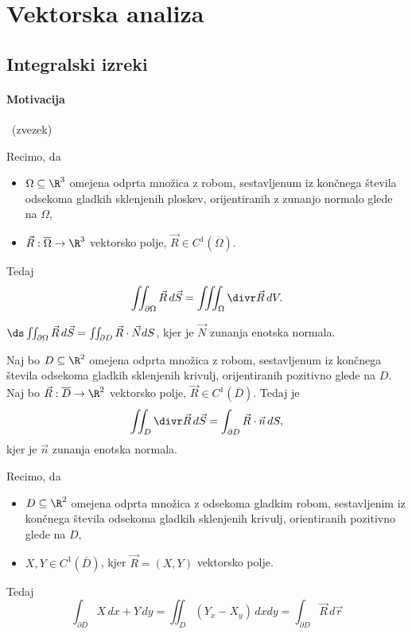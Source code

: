 \section{Vektorska analiza}

\todo

\subsection{Integralski izreki}
\paragraph{Motivacija} \todo \ (zvezek)
\begin{izrek} 
    Recimo, da     
    \begin{itemize}
        \item \(\Omega \subseteq \R^3\) omejena odprta množica z robom, sestavljenum iz končnega števila odsekoma gladkih sklenjenih ploskev, orijentiranih z zunanjo normalo glede na \(\Omega\),
        \item \(\vec{R}: \overline{\Omega} \to \R^3\) vektorsko polje, \(\vec{R} \in C^1(\overline{\Omega})\).
    \end{itemize}
    Tedaj 
    \[\iint_{\partial \Omega} \vec{R} \, d \vec{S} = \iiint_\Omega \divr \vec{R} \, d V .\]
\end{izrek}

\begin{opomba}
    \(\ds \iint_{\partial \Omega} \vec{R} \, d \vec{S} = \iint_{\partial D} \vec{R} \cdot \vec{N} dS\), kjer je \(\vec{N}\) zunanja enotska normala.
\end{opomba}

\begin{opomba}[\(n = 2\)]
    Naj bo \(D\subseteq \R^2\) omejena odprta množica z robom, sestavljenum iz končnega števila odsekoma gladkih sklenjenih krivulj, orijentiranih pozitivno glede na \(D\). Naj bo \(\vec{R}: \overline{D} \to \R^2\) vektorsko polje, \(\vec{R} \in C^1(\overline{D})\). Tedaj je 
    \[\iint_D \divr \vec{R} \, d \vec{S} = \int_{\partial D} \vec{R} \cdot \vec{n} \, dS,\]
    kjer je \(\vec{n}\) zunanja enotska normala.
\end{opomba}

\begin{izrek}
    Recimo, da
    \begin{itemize}
        \item \(D \subseteq \R^2\) omejena odprta množica z odsekoma gladkim robom, sestavljenim iz končnega števila odsekoma gladkih sklenjenih krivulj, orientiranih pozitivno glede na \(D\),
        \item \(X, Y \in C^1(\overline{D})\), kjer \(\vec{R} = (X, Y)\) vektorsko polje.
    \end{itemize}
    Tedaj 
    \[\int_{\partial D} X \, dx + Y \, dy = \iint_D (Y_x - X_y) \, dxdy = \int_{\partial D} \vec{R} \, d \vec{r} \]
\end{izrek}


